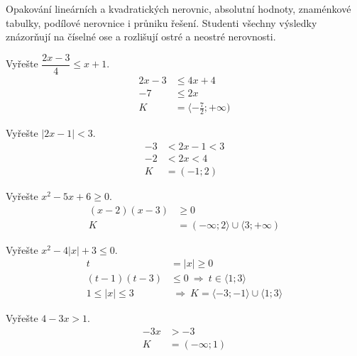 \documentclass[11pt,a4paper]{article}
\begin{document}
Opakování lineárních a kvadratických nerovnic, absolutní hodnoty, znaménkové tabulky, podílové nerovnice i průniku řešení. Studenti všechny výsledky znázorňují na číselné ose a rozlišují ostré a neostré nerovnosti.
\begin{prikladReseniBox}[title={Příklad 1}]
Vyřešte $\dfrac{2x-3}{4}\le x+1$.
\tcblower
\[
\begin{aligned}
2x-3&\le4x+4\\
-7&\le2x\\
K&=\langle-\tfrac72;+\infty)
\end{aligned}
\]

\end{prikladReseniBox}
\begin{prikladReseniBox}[title={Příklad 2}]
Vyřešte $|2x-1|<3$.
\tcblower
\[
\begin{aligned}
-3&<2x-1<3\\
-2&<2x<4\\
K&=(-1;2)
\end{aligned}
\]

\end{prikladReseniBox}
\begin{prikladReseniBox}[title={Příklad 3}]
Vyřešte $x^2-5x+6\ge0$.
\tcblower
\[
\begin{aligned}
(x-2)(x-3)&\ge0\\
K&=(-\infty;2\rangle\cup\langle3;+\infty)
\end{aligned}
\]

\end{prikladReseniBox}
\begin{prikladReseniBox}[title={Příklad 4}]
Vyřešte $x^2-4|x|+3\le0$.
\tcblower
\[
\begin{aligned}
t&=|x|\ge0\\
(t-1)(t-3)&\le0\ \Rightarrow\ t\in\langle1;3\rangle\\
1\le |x|\le3&\ \Rightarrow\ K=\langle-3;-1\rangle\cup\langle1;3\rangle
\end{aligned}
\]

\end{prikladReseniBox}
\begin{zadaniReseniBox}[title={Samostatná práce 1}]
Vyřešte $4-3x>1$.
\tcblower
\[
\begin{aligned}
-3x&>-3\\
K&=(-\infty;1)
\end{aligned}
\]

\end{zadaniReseniBox}
\end{document}
